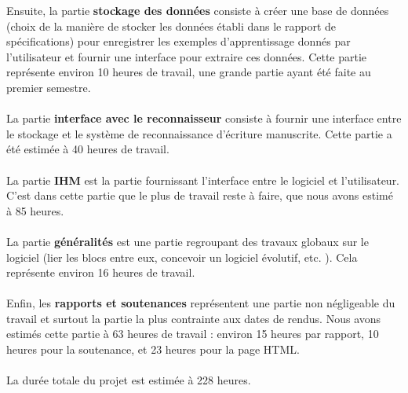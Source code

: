 Ensuite, la partie \textbf{stockage des données} consiste à créer une base de données (choix de la manière de stocker les données établi dans le rapport de spécifications) pour enregistrer les exemples d’apprentissage donnés par l’utilisateur et fournir une interface pour extraire ces données. Cette partie représente environ 10 heures de travail, une grande partie ayant été faite au premier semestre.

\paragraph{}

La partie \textbf{interface avec le reconnaisseur} consiste à fournir une interface entre le stockage et le système de reconnaissance d’écriture manuscrite. Cette partie a été estimée à 40 heures de travail.

\paragraph{}

La partie \textbf{IHM} est la partie fournissant l’interface entre le logiciel et l’utilisateur. C’est dans cette partie que le plus de travail reste à faire, que nous avons estimé à 85 heures.

\paragraph{}

La partie \textbf{généralités} est une partie regroupant des travaux globaux sur le logiciel (lier les blocs entre eux, concevoir un logiciel évolutif, etc. ). Cela représente environ 16 heures de travail.

\paragraph{}

Enfin, les \textbf{rapports et soutenances} représentent une partie non négligeable du travail et surtout la partie la plus contrainte aux dates de rendus. Nous avons estimés cette partie à 63 heures de travail : environ 15 heures par rapport, 10 heures pour la soutenance, et 23 heures pour la page HTML.

\paragraph{}

La durée totale du projet est estimée à 228 heures.

